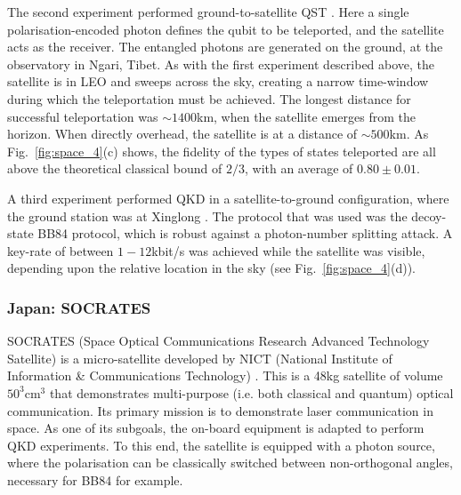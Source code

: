 The second experiment performed ground-to-satellite QST \cite{bib:ren2017ground}. Here a single polarisation-encoded photon defines the qubit to be teleported, and the satellite acts as the receiver. The entangled photons are generated on the ground, at the observatory in Ngari, Tibet. As with the first experiment described above, the satellite is in LEO and sweeps across the sky, creating a narrow time-window during which the teleportation must be achieved. The longest distance for successful teleportation was $\sim 1400$km, when the satellite emerges from the horizon. When directly overhead, the satellite is at a distance of $\sim 500$km. As Fig.~\ref{fig:space_4}(c) shows, the fidelity of the types of states teleported are all above the theoretical classical bound of $2/3$, with an average of $0.80 \pm 0.01$.  

A third experiment performed QKD in a satellite-to-ground configuration, where the ground station was at Xinglong \cite{bib:liao2017satellite}. The protocol that was used was the decoy-state BB84 protocol, which is robust against a photon-number splitting attack. A key-rate of between $1-12$kbit/s was achieved while the satellite was visible, depending upon the relative location in the sky (see Fig.~\ref{fig:space_4}(d)).

%
%

\subsubsection{Japan: SOCRATES}

SOCRATES (Space Optical Communications Research Advanced Technology Satellite) is a micro-satellite developed by NICT (National Institute of Information \& Communications Technology) \cite{bib:horiuchi2015view, bib:toyoshima2015current, bib:takenaka2017}. This is a 48kg satellite of volume $50^3$cm$^3$ that demonstrates multi-purpose (i.e. both classical and quantum) optical communication. Its primary mission is to demonstrate laser communication in space. As one of its subgoals, the on-board equipment is adapted to perform QKD experiments. To this end, the satellite is equipped with a photon source, where the polarisation can be classically switched between non-orthogonal angles, necessary for BB84 for example.

